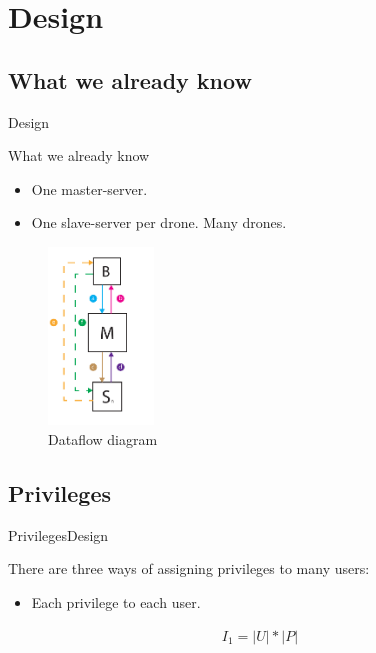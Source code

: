 
\author{Anders Eiler}
\section{Design}
\subsection{What we already know}
\begin{frame}{Design}
  \begin{block}{What we already know}
  \begin{itemize}
  	\item One master-server.
  	\item One slave-server per drone. Many drones. 
  \end{itemize}

  \begin{figure}[htb]
    \centering
    \includegraphics[width=0.25\textwidth]{gfx/dataflow_diagram.pdf}
    \caption{Dataflow diagram}
  \end{figure}

  \end{block}
\end{frame}

\subsection{Privileges}
\begin{frame}{Privileges}{Design}
  \begin{block}{}
  	There are three ways of assigning privileges to many users:

  	\begin{itemize}
  		\item Each privilege to each user.
  	\end{itemize}

  	\begin{align}
		I_1 = |U|*|P|
	\end{align}
  \end{block}
\end{frame}

